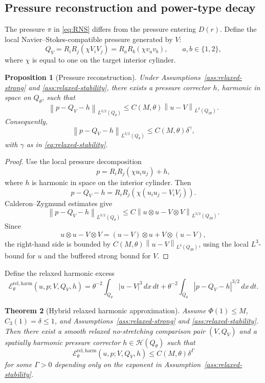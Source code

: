 \documentclass[pdflatex,sn-mathphys-num]{sn-jnl}
\numberwithin{equation}{section}
\theoremstyle{thmstyleone}
\newtheorem{theorem}{Theorem}[section]
\newtheorem{proposition}[theorem]{Proposition}
\theoremstyle{thmstylethree}
\newcommand{\dxdt}{\,dx\,dt}
\newcommand{\norm}[2]{\left\|#1\right\|_{#2}}
\newcommand{\calH}{\mathcal H}
\newcommand{\calE}{\mathcal E}
\newcommand{\harm}{\mathrm{harm}}
\newcommand{\rel}{\mathrm{rel}}
\begin{document}
\subsection{Pressure reconstruction and power-type decay}

The pressure \(\pi\) in \eqref{eq:RNS} differs from the pressure entering \(D(r)\).  Define the local Navier--Stokes-compatible pressure generated by \(V\):
\[
        Q_V=R_iR_j(\chi V_iV_j)=R_aR_b(\chi v_av_b),
        \qquad a,b\in\{1,2\},
\]
where \(\chi\) is equal to one on the target interior cylinder.

\begin{proposition}[Pressure reconstruction]
\label{prop:pressure-reconstruction}
Under Assumptions~\ref{ass:relaxed-strong} and \ref{ass:relaxed-stability}, there exists a pressure corrector \(h\), harmonic in space on \(Q_\theta\), such that
\begin{equation}
        \norm{p-Q_V-h}{L^{3/2}(Q_\theta)}
        \le C(M,\theta)\norm{u-V}{L^3(Q_{2\theta})}.
        \label{eq:pressure-reconstruction}
\end{equation}
Consequently,
\[
        \norm{p-Q_V-h}{L^{3/2}(Q_\theta)}
        \le C(M,\theta)\delta^\gamma,
\]
with \(\gamma\) as in \eqref{eq:relaxed-stability}.
\end{proposition}

\begin{proof}
Use the local pressure decomposition
\[
        p=R_iR_j(\chi u_iu_j)+h,
\]
where \(h\) is harmonic in space on the interior cylinder.  Then
\[
        p-Q_V-h
        =R_iR_j(\chi(u_iu_j-V_iV_j)).
\]
Calderon--Zygmund estimates give
\[
        \norm{p-Q_V-h}{L^{3/2}(Q_\theta)}
        \le C\norm{u\otimes u-V\otimes V}{L^{3/2}(Q_{2\theta})}.
\]
Since
\[
        u\otimes u-V\otimes V=(u-V)\otimes u+V\otimes(u-V),
\]
the right-hand side is bounded by \(C(M,\theta)\norm{u-V}{L^3(Q_{2\theta})}\), using the local \(L^3\)-bound for \(u\) and the buffered strong bound for \(V\).
\end{proof}

Define the relaxed harmonic excess
\[
\calE^{\rel,\harm}_\theta(u,p;V,Q_V,h)
=\theta^{-2}\int_{Q_\theta}|u-V|^3\dxdt
+\theta^{-2}\int_{Q_\theta}|p-Q_V-h|^{3/2}\dxdt.
\]

\begin{theorem}[Hybrid relaxed harmonic approximation]
\label{thm:relaxed-harmonic-approx}
Assume \(\Phi(1)\le M\), \(C_3(1)=\delta\le1\), and Assumptions~\ref{ass:relaxed-strong} and \ref{ass:relaxed-stability}.  Then there exist a smooth relaxed no-stretching comparison pair \((V,Q_V)\) and a spatially harmonic pressure corrector \(h\in\calH(Q_\theta)\) such that
\begin{equation}
        \calE^{\rel,\harm}_\theta(u,p;V,Q_V,h)
        \le C(M,\theta)\delta^\Gamma
        \label{eq:relaxed-harmonic-approx}
\end{equation}
for some \(\Gamma>0\) depending only on the exponent in Assumption~\ref{ass:relaxed-stability}.
\end{theorem}
\end{document}
